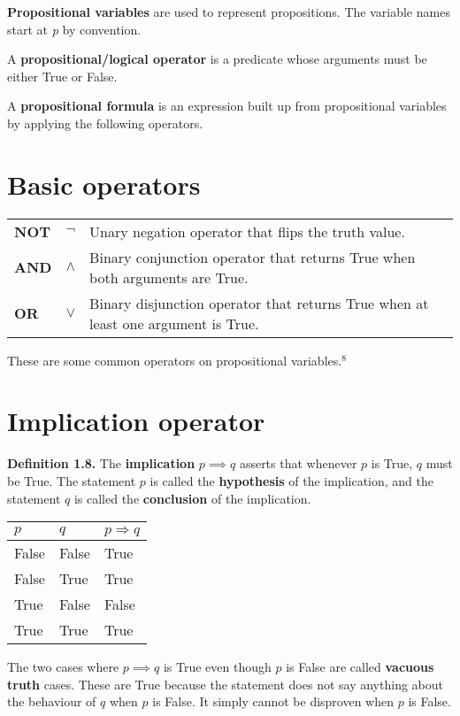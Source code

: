 \documentclass{article}
\begin{document}
\textbf{Propositional variables} are used to represent propositions. The variable
names start at \emph{p} by convention. 

A \textbf{propositional/logical operator} is a predicate whose arguments 
must be either True or False.

A \textbf{propositional formula} is an expression built up from propositional
variables by applying the following operators.

\newpage
\section{Basic operators}
\begin{tabular}{|p{1cm} p{1cm} p{7cm}|}
    \textbf{NOT} & $\neg$ & Unary negation operator that flips the truth value. \\
    \textbf{AND} & $\land$ & Binary conjunction operator that returns True when both
    arguments are True. \\
    \textbf{OR} & $\lor$ & Binary disjunction operator that returns True when at least
    one argument is True. \\
\end{tabular}

These are some common operators on propositional variables.$^{8}$ 

\section{Implication operator}
\textbf{Definition 1.8.} The \textbf{implication} $p \implies q $ asserts 
that whenever $p$ is True, $q$ must be True. The statement $p$ is called
the \textbf{hypothesis} of the implication, and the statement $q$ is called
the \textbf{conclusion} of the implication.

\begin{center}
    
\begin{tabular}{|p{1cm} p{1cm} p{1cm}|}
    \hline
    $p$ & $q$ & $p \Rightarrow q$ \\
    \hline 
    False & False & True \\
    False & True & True \\
    True & False & False \\
    True & True & True \\
    \hline   
\end{tabular}
\end{center}
The two cases where $ p \implies q$ is True even though $p$ is False are
called \textbf{vacuous truth} cases. These are True because the statement
does not say anything about the behaviour of $q$ when $p$ is False. It simply
cannot be disproven when $p$ is False.
\end{document}
